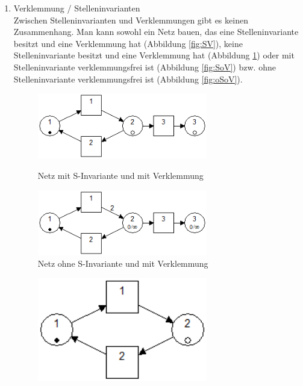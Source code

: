 \documentclass[10pt]{scrartcl}
\begin{document}
\begin{enumerate}
\item{Verklemmung / Stelleninvarianten}\\
Zwischen Stelleninvarianten und Verklemmungen gibt es keinen Zusammenhang. Man kann sowohl ein Netz bauen, das eine Stelleninvariante besitzt und eine Verklemmung hat (Abbildung \ref{fig:SV}), keine Stelleninvariante besitzt und eine Verklemmung hat (Abbildung \ref{fig:oSV}) oder mit Stelleninvariante verklemmungsfrei ist (Abbildung \ref{fig:SoV}) bzw. ohne Stelleninvariante verklemmungsfrei ist (Abbildung \ref{fig:oSoV}).

\begin{figure}
\begin{minipage}[hbt]{7cm}
	\centering
	\includegraphics[width=0.7\textwidth]{Bilder/33_Stelleninvariante_mit_Verklemmung.png}
	\caption{Netz mit S-Invariante und mit Verklemmung}
	\label{fig:SV}
\end{minipage}
\hfill
\begin{minipage}[hbt]{7cm}
	\centering
	\includegraphics[width=0.7\textwidth]{Bilder/33_ohne_Stelleninvariante_mit_Verklemmung.png}
	\caption{Netz ohne S-Invariante und mit Verklemmung}
	\label{fig:oSV}
\end{minipage}
\end{figure}
\begin{figure}
\begin{minipage}[hbt]{7cm}
	\centering
	\includegraphics[width=0.7\textwidth]{Bilder/33_Stelleninvariante_ohne_Verklemmung.png}

\end{minipage}
\end{figure}
\end{enumerate}
\end{document}
